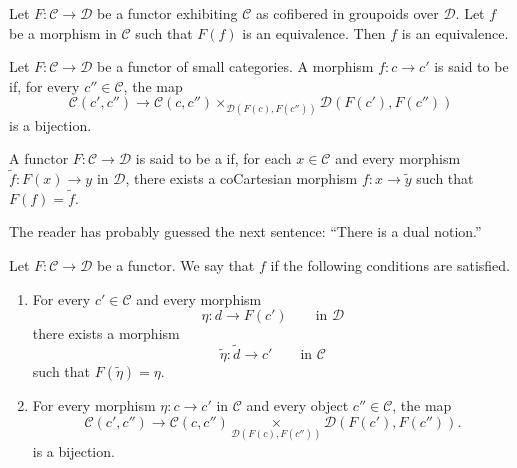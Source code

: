 \documentclass[main.tex]{subfiles}
\begin{document}
\begin{lemma}
  \label{lemma:cofibered_in_groupoids_morphism_mapped_to_equivalence_is_equivalence}
  Let $F\colon \mathcal{C} \to \mathcal{D}$ be a functor exhibiting $\mathcal{C}$ as cofibered in groupoids over $\mathcal{D}$. Let $f$ be a morphism in $\mathcal{C}$ such that $F(f)$ is an equivalence. Then $f$ is an equivalence.
\end{lemma}


\begin{definition}
  \label{def:cocartesian_morphismfibration}
  Let $F\colon \mathcal{C} \to \mathcal{D}$ be a functor of small categories. A morphism $f\colon c \to c'$ is said to be  if, for every $c'' \in \mathcal{C}$, the map
  \begin{equation*}
    \mathcal{C}(c', c'') \to \mathcal{C}(c, c'') \times_{\mathcal{D}(F(c), F(c''))} \mathcal{D}(F(c'), F(c''))
  \end{equation*}
  is a bijection.
\end{definition}

\begin{definition}
  \label{def:cocartesian_fibration}
  A functor $F\colon \mathcal{C} \to \mathcal{D}$ is said to be a  if, for each $x \in \mathcal{C}$ and every morphism $\tilde{f}\colon F(x) \to y$ in $\mathcal{D}$, there exists a coCartesian morphism $f\colon x \to \tilde{y}$ such that $F(f) = \tilde{f}$.
\end{definition}

The reader has probably guessed the next sentence: ``There is a dual notion.''

\begin{definition}
  \label{def:fibrant_in_groupoids}
  Let $F\colon \mathcal{C} \to \mathcal{D}$ be a functor. We say that $f$  if the following conditions are satisfied.
  \begin{enumerate}
    \item For every $c' \in \mathcal{C}$ and every morphism
      \begin{equation*}
        \eta\colon d \to F(c') \qquad\text{in }\mathcal{D}
      \end{equation*}
      there exists a morphism
      \begin{equation*}
        \tilde{\eta}\colon \tilde{d} \to c' \qquad\text{in }\mathcal{C}
      \end{equation*}
      such that $F(\tilde{\eta}) = \eta$.

    \item For every morphism $\eta\colon c \to c'$ in $\mathcal{C}$ and every object $c'' \in \mathcal{C}$, the map
      \begin{equation*}
        \mathcal{C}(c', c'') \to\mathcal{C}(c, c'') \underset{\mathcal{D}(F(c), F(c''))}{\times}\mathcal{D}(F(c'), F(c'')).
      \end{equation*}
      is a bijection.
  \end{enumerate}
\end{definition}
\end{document}
